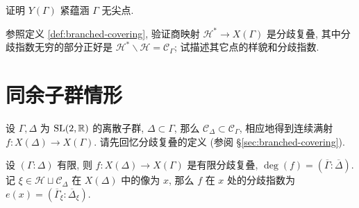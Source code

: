 \begin{exercise}
	证明 $Y(\Gamma)$ 紧蕴涵 $\Gamma$ 无尖点.
\end{exercise}

\begin{exercise}
	参照定义 \ref{def:branched-covering}, 验证商映射 $\mathcal{H}^* \to X(\Gamma)$ 是分歧复叠, 其中分歧指数无穷的部分正好是 $\mathcal{H}^* \smallsetminus \mathcal{H} = \mathcal{C}_\Gamma$; 试描述其它点的样貌和分歧指数.
\end{exercise}

\section{同余子群情形}\label{sec:cong-compactification}
设 $\Gamma, \Delta$ 为 $\operatorname{SL}(2,\mathbb{R})$ 的离散子群, $\Delta \subset \Gamma$, 那么 $\mathcal{C}_\Delta \subset \mathcal{C}_\Gamma$, 相应地得到连续满射 $f: X(\Delta) \to X(\Gamma)$. 请先回忆分歧复叠的定义 (参阅 \S\ref{sec:branched-covering}).

\begin{proposition}\label{prop:commensurable-covering}
	设 $(\Gamma:\Delta)$ 有限, 则 $f: X(\Delta) \to X(\Gamma)$ 是有限分歧复叠, $\deg(f) = \left( \overline{\Gamma} : \overline{\Delta} \right)$. 记 $\xi \in \mathcal{H} \sqcup \mathcal{C}_\Delta$ 在 $X(\Delta)$ 中的像为 $x$, 那么 $f$ 在 $x$ 处的分歧指数为 $e(x) = \left( \overline{\Gamma}_\xi : \overline{\Delta}_\xi \right)$.
\end{proposition}

